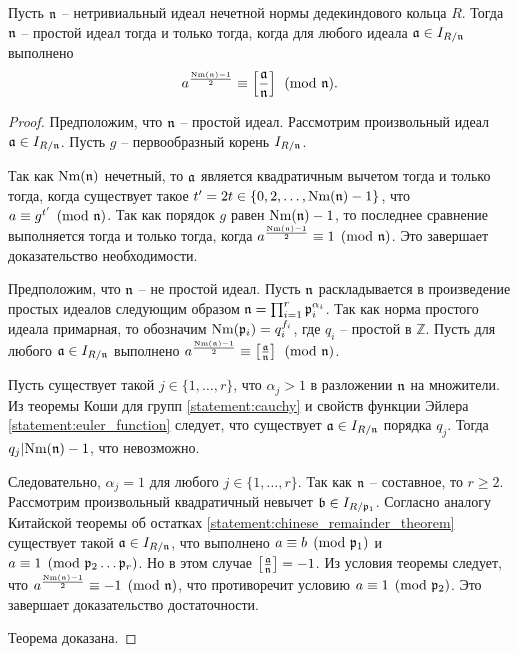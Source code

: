 \documentclass[_00_dissertation.tex]{subfiles}
\begin{document}
\begin{theorem}\label{theorem:euler_criteria}
    Пусть $\mathfrak{n}$ -- нетривиальный идеал нечетной нормы дедекиндового кольца $R$.
    Тогда $\mathfrak{n}$ -- простой идеал тогда и только тогда, когда для любого идеала $\mathfrak{a} \in I_{R/\mathfrak{n}}$ выполнено
    \begin{equation*}
        a^{\frac{\textrm{Nm}(\mathfrak{n}) - 1}{2}} \equiv \left[\frac{\mathfrak{a}}{\mathfrak{n}}\right] \pmod{\mathfrak{n}}.
    \end{equation*}
\end{theorem}
\begin{proof}
    Предположим, что $\mathfrak{n}$ -- простой идеал.
    Рассмотрим произвольный идеал $\mathfrak{a} \in I_{R/\mathfrak{n}}$.
    Пусть $g$ -- первообразный корень $I_{R/\mathfrak{n}}$.

    Так как $\textrm{Nm}(\mathfrak{n})$ нечетный, то $\mathfrak{a}$ является квадратичным вычетом тогда и только тогда, когда существует такое $t' = 2t \in \{0, 2, \dots, \textrm{Nm}(\mathfrak{n}) - 1\}$, что $a \equiv g^{t'} \pmod{\mathfrak{n}}$.
    Так как порядок $g$ равен $\textrm{Nm}(\mathfrak{n}) - 1$, то последнее сравнение выполняется тогда и только тогда, когда $a^{\frac{\textrm{Nm}(\mathfrak{n}) - 1}{2}} \equiv 1 \pmod{\mathfrak{n}}$.
    Это завершает доказательство необходимости.

    Предположим, что $\mathfrak{n}$ -- не простой идеал.
    Пусть $\mathfrak{n}$ раскладывается в произведение простых идеалов следующим образом $\mathfrak{n} = \prod_{i=1}^{r} \mathfrak{p}_i^{\alpha_i}$.
    Так как норма простого идеала примарная, то обозначим $\textrm{Nm}(\mathfrak{p}_i) = q_i^{f_i}$, где $q_i$ -- простой в $\mathbb{Z}$.
    Пусть для любого $\mathfrak{a} \in I_{R/\mathfrak{n}}$ выполнено $a^{\frac{\textrm{Nm}(\mathfrak{n}) - 1}{2}} \equiv \left[\frac{\mathfrak{a}}{\mathfrak{n}}\right] \pmod{\mathfrak{n}}$.

    Пусть существует такой $j \in \{1, \dots, r\}$, что $\alpha_j > 1$ в разложении $\mathfrak{n}$ на множители.
    Из теоремы Коши для групп \ref{statement:cauchy} и свойств функции Эйлера \ref{statement:euler_function} следует, что существует $\mathfrak{a} \in I_{R/\mathfrak{n}}$ порядка $q_j$.
    Тогда $q_j | \textrm{Nm}(\mathfrak{n}) - 1$, что невозможно.

    Следовательно, $\alpha_j = 1$ для любого $j \in \{1, \ldots, r\}$.
    Так как $\mathfrak{n}$ -- составное, то $r \ge 2$.
    Рассмотрим произвольный квадратичный невычет $\mathfrak{b} \in I_{R/\mathfrak{p}_1}$.
    Согласно аналогу Китайской теоремы об остатках \ref{statement:chinese_remainder_theorem} существует такой $\mathfrak{a} \in I_{R/\mathfrak{n}}$, что выполнено $a \equiv b \pmod{\mathfrak{p}_1}$ и $a \equiv 1 \pmod{\mathfrak{p}_2\dots\mathfrak{p}_r}$.
    Но в этом случае $\left[\frac{\mathfrak{a}}{\mathfrak{n}}\right] = -1$.
    Из условия теоремы следует, что $a^{\frac{\textrm{Nm}(\mathfrak{n}) - 1}{2}} \equiv -1 \pmod{\mathfrak{n}}$, что противоречит условию $a \equiv 1 \pmod{\mathfrak{p}_2}$.
    Это завершает доказательство достаточности.

    Теорема доказана.
\end{proof}
\end{document}
